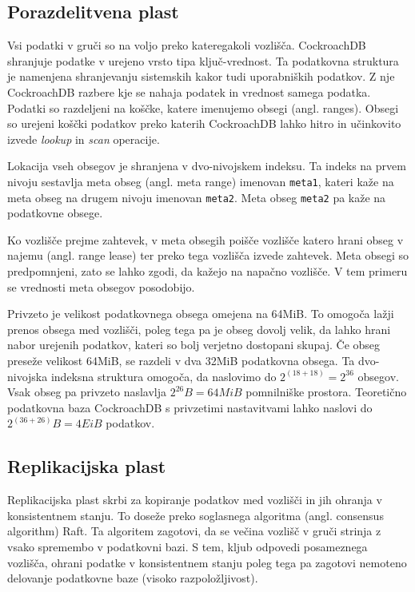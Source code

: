 \documentclass[a4paper, 12pt]{book}
\begin{document}
 
\subsection{Porazdelitvena plast}

Vsi podatki v gruči so na voljo preko kateregakoli vozlišča. CockroachDB shranjuje podatke v urejeno vrsto tipa ključ-vrednost. Ta podatkovna stru\-ktu\-ra je namenjena shranjevanju sistemskih kakor tudi uporabniških podatkov. Z nje CockroachDB razbere kje se nahaja podatek in vrednost samega podatka. Podatki so razdeljeni na koščke, katere imenujemo obsegi (angl. ranges). Obsegi so urejeni koščki podatkov preko katerih CockroachDB lahko hitro in učinkovito izvede \textit{lookup} in \textit{scan} operacije.

Lokacija vseh obsegov je shranjena v dvo-nivojskem indeksu. Ta indeks na prvem nivoju sestavlja meta obseg (angl. meta range) imenovan \texttt{meta1}, kateri kaže na meta obseg na drugem nivoju imenovan \texttt{meta2}. Meta obseg \texttt{meta2} pa kaže na podatkovne obsege.

Ko vozlišče prejme zahtevek, v meta obsegih poišče vozlišče katero hrani obseg v najemu (angl. range lease) ter preko tega vozlišča izvede zahtevek. Meta obsegi so predpomnjeni, zato se lahko zgodi, da kažejo na napačno vozlišče. V tem primeru se vrednosti meta obsegov posodobijo.

Privzeto je velikost podatkovnega obsega omejena na 64MiB. To omogoča lažji prenos obsega med vozlišči, poleg tega pa je obseg dovolj velik, da lahko hrani nabor urejenih podatkov, kateri so bolj verjetno dostopani skupaj. Če obseg preseže velikost 64MiB, se razdeli v dva 32MiB podatkovna obsega. Ta dvo-nivojska indeksna struktura omogoča, da naslovimo do \(2^{(18 + 18)} = 2^{36}\) obsegov. Vsak obseg pa privzeto naslavlja \(2^{26}B = 64MiB\) pomnilniške prostora. Teoretično podatkovna baza CockroachDB s privzetimi nastavitvami lahko naslovi do \(2^{(36+26)}B = 4EiB\) podatkov. 

\subsection{Replikacijska plast}

Replikacijska plast skrbi za kopiranje podatkov med vozlišči in jih ohranja v konsistentnem stanju. To doseže preko soglasnega algoritma (angl. consensus algorithm) Raft. Ta algoritem zagotovi, da se večina vozlišč v gruči strinja z vsako spremembo v podatkovni bazi. S tem, kljub odpovedi posameznega vozlišča, ohrani podatke v konsistentnem stanju poleg tega pa zagotovi nemoteno delovanje podatkovne baze (visoko razpoložljivost).
\end{document}
